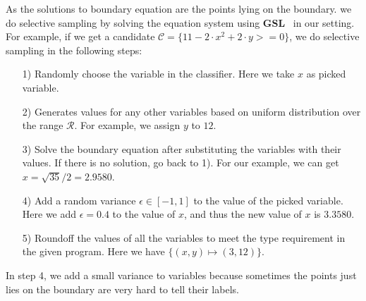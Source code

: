 As the solutions to boundary equation are the points lying on the boundary. 
we do selective sampling by solving the equation system using \textbf{GSL}~\cite{gough2009gnu} in our setting.
For example, if we get a candidate $\mathcal{C} = \{11-2\cdot x^2+2\cdot y>=0\}$,
we do selective sampling in the following steps:
\begin{itemize}
\item[1)] Randomly choose the variable in the classifier. Here we take $x$ as picked variable.
\item[2)] Generates values for any other variables based on uniform distribution over the range $\mathcal{R}$. For example, we assign $y$ to $12$.
\item[3)] Solve the boundary equation after substituting the variables with their values. If there is no solution, go back to 1). For our example, we can get $x = \sqrt{35}/2 = 2.9580$.
\item[4)] Add a random variance $\epsilon \in [-1, 1]$ to the value of the picked variable. Here we add $\epsilon = 0.4$ to the value of $x$, and thus the new value of $x$ is $3.3580$. 
\item[5)] Roundoff the values of all the variables to meet the type requirement in the given program. Here we have $\{(x,y) \mapsto (3, 12)\}$.
\end{itemize}

In step 4, we add a small variance to variables because sometimes the points just lies on the boundary are very hard to tell their labels. 

